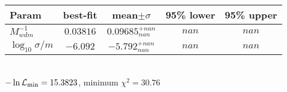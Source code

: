 \begin{tabular}{|l|c|c|c|c|} 
 \hline 
Param & best-fit & mean$\pm\sigma$ & 95\% lower & 95\% upper \\ \hline 
$M_{wdm}^{-1}$ &$0.03816$ & $0.09685_{nan}^{+nan}$ & $nan$ & $nan$ \\ 
$\log_{10}{\sigma / m}$ &$-6.092$ & $-5.792_{nan}^{+nan}$ & $nan$ & $nan$ \\ 
\hline 
 \end{tabular} \\ 
$-\ln{\cal L}_\mathrm{min} =15.3823$, minimum $\chi^2=30.76$ \\ 
